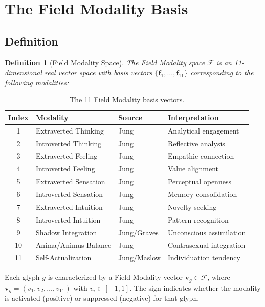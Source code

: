 \documentclass[11pt,a4paper]{article}
\newtheorem{definition}{Definition}
\begin{document}
\section{The Field Modality Basis}

\subsection{Definition}

\begin{definition}[Field Modality Space]
The Field Modality space $\mathcal{F}$ is an 11-dimensional real vector space with basis vectors $\{\mathbf{f}_1, \ldots, \mathbf{f}_{11}\}$ corresponding to the following modalities:
\end{definition}

\begin{table}[h]
\centering
\caption{The 11 Field Modality basis vectors.}
\label{tab:modalities}
\begin{tabular}{@{}clll@{}}
\toprule
Index & Modality & Source & Interpretation \\
\midrule
1 & Extraverted Thinking & Jung & Analytical engagement \\
2 & Introverted Thinking & Jung & Reflective analysis \\
3 & Extraverted Feeling & Jung & Empathic connection \\
4 & Introverted Feeling & Jung & Value alignment \\
5 & Extraverted Sensation & Jung & Perceptual openness \\
6 & Introverted Sensation & Jung & Memory consolidation \\
7 & Extraverted Intuition & Jung & Novelty seeking \\
8 & Introverted Intuition & Jung & Pattern recognition \\
9 & Shadow Integration & Jung/Graves & Unconscious assimilation \\
10 & Anima/Animus Balance & Jung & Contrasexual integration \\
11 & Self-Actualization & Jung/Maslow & Individuation tendency \\
\bottomrule
\end{tabular}
\end{table}

Each glyph $g$ is characterized by a Field Modality vector $\mathbf{v}_g \in \mathcal{F}$, where $\mathbf{v}_g = (v_1, v_2, \ldots, v_{11})$ with $v_i \in [-1, 1]$. The sign indicates whether the modality is activated (positive) or suppressed (negative) for that glyph.
\end{document}
